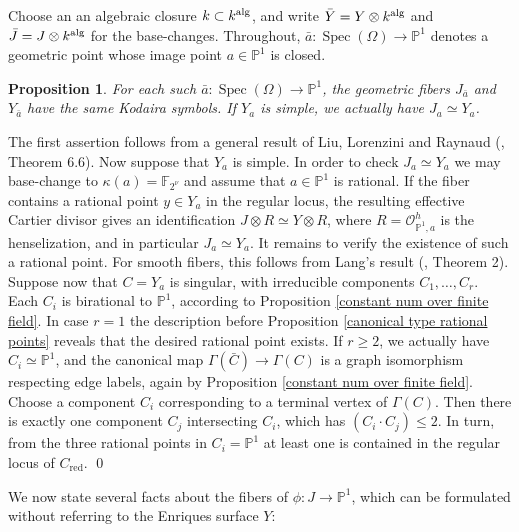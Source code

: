 \documentclass[oneside, 12pt]{amsart}
\newcommand\mylabel[1]{\label{#1}\marginpar{\vspace{-1ex}\medskip\medskip\footnotesize \tt #1}}
\renewcommand\mylabel[1]{\label{#1}}
\newtheorem{proposition}[theorem]{Proposition}
\theoremstyle{definition}
\theoremstyle{remark}
\newcommand{\FF}{\mathbb{F}}
\newcommand{\PP}{\mathbb{P}}
\newcommand{\alg}{\text{\rm alg}}
\renewcommand{\O}{\mathscr{O}}
\newcommand{\ra}{\rightarrow}
\newcommand{\red}{{\operatorname{red}}}
\newcommand{\Spec}{\operatorname{Spec}}
\newcommand{\bY}{{\bar{Y}}}
\newcommand{\bC}{{\bar{C}}}
\newcommand{\bJ}{{\bar{J}}}
\newcommand{\ba}{{\bar{a}}}
\begin{document}
Choose an an algebraic closure $k\subset k^\alg$, and write $\bY=Y\otimes k^\alg$ and $\bJ=J\otimes k^\alg$
for the   base-changes.
Throughout, $\ba:\Spec(\Omega)\ra \PP^1$ denotes a  geometric point   whose image
point $a\in \PP^1$ is closed.

\begin{proposition}
\mylabel{same symbols}
For each  such  $\ba:\Spec(\Omega)\ra \PP^1$, the geometric fibers $J_\ba$ and $Y_\ba$ have the same Kodaira symbols.
If  $Y_a$ is simple,  we actually have $J_a\simeq Y_a$.
\end{proposition}

\proof
The first assertion follows from a general result of Liu, Lorenzini and Raynaud 
(\cite{Liu; Lorenzini; Raynaud 2005}, Theorem 6.6). Now suppose that $Y_a$ is simple.
In order to check $J_a\simeq Y_a$ we may base-change to $\kappa(a)=\FF_{2^\nu}$ and assume that $a\in\PP^1$ is rational.
If the fiber contains a rational point $y\in Y_a$ in the regular locus, the resulting 
effective Cartier divisor gives an identification $J\otimes R\simeq Y\otimes R$,
where $R=\O_{\PP^1,a}^h$ is the henselization, and in particular $J_a\simeq Y_a$.
It remains  to verify the existence of such a  rational point. 
For smooth fibers, this follows from Lang's result (\cite{Lang 1956}, Theorem 2).
Suppose now that $C=Y_a$ is singular, with irreducible components $C_1,\ldots, C_r$.
Each $C_i$ is birational to $\PP^1$, according to Proposition \ref{constant num over finite field}.
In case $r=1$  the description before Proposition \ref{canonical type rational points} 
reveals that the desired rational point exists.
If $r\geq 2$, we actually have $C_i\simeq \PP^1$, and
the canonical map $\Gamma(\bC)\ra\Gamma(C)$ is a graph isomorphism respecting edge labels, 
again by Proposition \ref{constant num over finite field}.
Choose a component $C_i$ corresponding to a terminal vertex of $\Gamma(C)$. Then there is exactly one
component $C_j$ intersecting $C_i$, which has $(C_i\cdot C_j)\leq 2$.
In turn, from the three rational points in $C_i=\PP^1$ at least one is contained in
the regular locus of $C_\red$. 
\qed

\medskip
We now state   several facts about the fibers of $\phi:J\ra\PP^1$, which can be formulated without referring to the Enriques surface $Y$:
\setcounter{jac}{0}
\renewcommand{\thejac}{\rm \roman{jac}}
\newcommand{\labeljac}[1]{\refstepcounter{jac}\mylabel{#1}}
\newcommand{\refjac}[1] {{\rm (\ref{#1})}}
\end{document}
